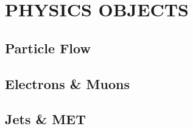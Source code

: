 %
%
%



\chapter{\uppercase {Physics Objects}}

\section{Particle Flow}

\section{Electrons \& Muons}

\section{Jets \& MET}

